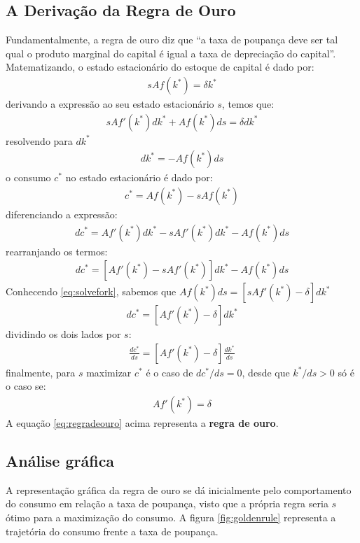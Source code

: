 \documentclass[11pt,a4paper]{article}
\begin{document}
\subsection{A Derivação da Regra de Ouro}

Fundamentalmente, a regra de ouro diz que ``a taxa de poupança deve ser tal qual o produto marginal do capital é igual a taxa de depreciação do capital''. Matematizando, o estado estacionário do estoque de capital é dado por:
\begin{align}
sAf(k^{\ast}) = \delta k^{\ast}
\end{align}
derivando a expressão ao seu estado estacionário $s$, temos que:
\begin{align}
sAf'(k^{\ast})dk^{\ast} + Af(k^{\ast})ds = \delta dk^{\ast}
\end{align}
resolvendo para $dk^{\ast}$
\begin{align} 
[sAf'(k^{\ast}) - \delta ]dk^{\ast} = -Af(k^{\ast})ds \label{eq:solvefork}
\end{align}
o consumo $c^{\ast}$ no estado estacionário é dado por:
\begin{align}
c^{\ast} = Af(k^{\ast}) - sAf(k^{\ast})
\end{align}
diferenciando a expressão:
\begin{align}
dc^{\ast} = Af'(k^{\ast})dk^{\ast} - sAf'(k^{\ast})dk^{\ast} - Af(k^{\ast})ds
\end{align}
rearranjando os termos:
\begin{align}
dc^{\ast} = [Af'(k^{\ast}) - sAf'(k^{\ast})]dk^{\ast} - Af(k^{\ast})ds
\end{align}
Conhecendo \ref{eq:solvefork}, sabemos que $Af(k^{\ast})ds = [sAf'(k^{\ast}) - \delta ]dk^{\ast}$
\begin{align}
dc^{\ast} = [Af'(k^{\ast}) - \delta ]dk^{\ast}
\end{align}
dividindo os dois lados por $s$:
\begin{align}
\frac{dc^{\ast}}{ds} = [Af'(k^{\ast}) - \delta ]\frac{dk^{\ast}}{ds}
\end{align}
finalmente, para $s$ maximizar $c^{\ast}$ é o caso de $dc^{\ast}/ds = 0$, desde que $k^{\ast} / ds >0$ só é o caso se:
\begin{align}
Af'(k^{\ast}) = \delta \label{eq:regradeouro}
\end{align}
\noindent
A equação \ref{eq:regradeouro} acima representa a \textbf{regra de ouro}.

\subsection{Análise gráfica}
A representação gráfica da regra de ouro se dá inicialmente pelo comportamento do consumo em relação a taxa de poupança, visto que a própria regra seria $s$ ótimo para a maximização do consumo. A figura \ref{fig:goldenrule} representa a trajetória do consumo frente a taxa de poupança.
\end{document}
